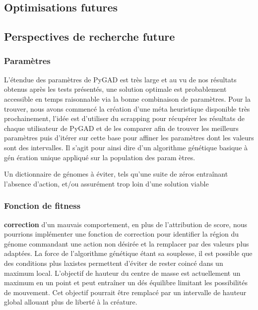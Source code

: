 \documentclass[journal, a4paper]{IEEEtran}
\begin{document}
\subsection{Optimisations futures}\label{subsec:optimisations-futures}


\subsection{Perspectives de recherche future}\label{subsec:perspectives-de-recherche-future}

\subsubsection{Paramètres}
	L'étendue des paramètres de PyGAD est très large et au vu de nos
	résultats obtenus après les tests présentés,
	une solution
	optimale est probablement accessible en temps raisonnable via
	la bonne combinaison de paramètres.
	Pour la trouver, nous avons commencé la création d'une
	méta heuristique disponible très prochainement, l'idée est
	d'utiliser du scrapping pour récupérer les résultats de chaque
	utilisateur de PyGAD et de les comparer afin de trouver les
	meilleurs paramètres puis d'itérer sur cette base pour affiner
	les paramètres dont les valeurs sont des intervalles. Il s'agit
	pour ainsi dire d'un algorithme génétique basique à gén
	ération unique appliqué sur
	la population des param
	ètres.

	Un dictionnaire de génomes à éviter, tels qu'une suite de zéros
	entraînant l'absence d'action, et/ou assurément trop loin d'une
	solution viable
\subsubsection{Fonction de fitness}
	\textbf{correction} d'un mauvais comportement, en plus de
	l'attribution	de score, nous
	pourrions implémenter une fonction de correction pour identifier
	la région du génome commandant une action non désirée et la
	remplacer par des valeurs plus adaptées.
	La force de l'algorithme génétique étant sa souplesse, il est possible
	que des conditions plus laxistes permettent d'éviter de rester coincé
	dans un maximum local.
	L'objectif de hauteur du centre de masse est
	actuellement un maximum en un point et peut entraîner un dés
	équilibre limitant les possibilités de mouvement.
	Cet objectif pourrait être remplacé par	un intervalle de hauteur
	global allouant plus de liberté à la créature.
\end{document}
